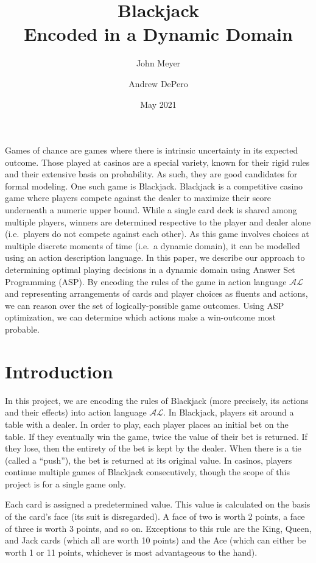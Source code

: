 \documentclass{article}
\title{Blackjack \\ Encoded in a Dynamic Domain}
\author{
    John Meyer
    \and
    Andrew DePero
}
\date{May 2021}
\begin{document}
\maketitle

\noindent
Games of chance are games where there is intrinsic uncertainty in its expected outcome.
Those played at casinos are a special variety, known for their rigid rules and their extensive basis on probability.
As such, they are good candidates for formal modeling.
One such game is Blackjack.
Blackjack is a competitive casino game where players compete against the dealer to maximize their score underneath a numeric upper bound.
While a single card deck is shared among multiple players, winners are determined respective to the player and dealer alone (i.e.~players do not compete against each other).
As this game involves choices at multiple discrete moments of time (i.e.~a dynamic domain), it can be modelled using an action description language.
In this paper, we describe our approach to determining optimal playing decisions in a dynamic domain using Answer Set Programming (ASP).
By encoding the rules of the game in action language $\mathcal{AL}$ and representing arrangements of cards and player choices as fluents and actions, we can reason over the set of logically-possible game outcomes.
Using ASP optimization, we can determine which actions make a win-outcome most probable.

\section{Introduction}

In this project, we are encoding the rules of Blackjack (more precisely, its actions and their effects) into action language $\mathcal{AL}$.
In Blackjack, players sit around a table with a dealer.
In order to play, each player places an initial bet on the table.
If they eventually win the game, twice the value of their bet is returned.
If they lose, then the entirety of the bet is kept by the dealer.
When there is a tie (called a ``push''), the bet is returned at its original value.
In casinos, players continue multiple games of Blackjack consecutively, though the scope of this project is for a single game only.

Each card is assigned a predetermined value.
This value is calculated on the basis of the card's face (its suit is disregarded).
A face of two is worth 2 points, a face of three is worth 3 points, and so on.
Exceptions to this rule are the King, Queen, and Jack cards (which all are worth 10 points) and the Ace (which can either be worth 1 or 11 points, whichever is most advantageous to the hand).
\end{document}
